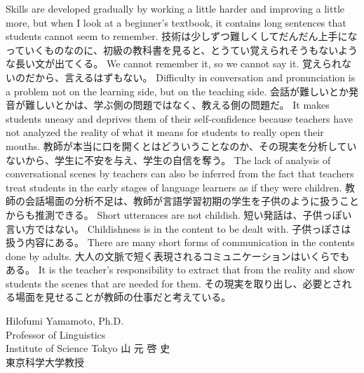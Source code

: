 \documentclass[uplatex,dvipdfmx,b5paper,english,10pt]{jsbook}
\begin{document}
\ifEnglish
Skills are developed gradually by working a little harder and improving a little more, but when I look at a beginner's textbook, it contains long sentences that students cannot seem to remember.
\else
技術は少しずつ難しくしてだんだん上手になっていくものなのに、初級の教科書を見ると、とうてい覚えられそうもないような長い文が出てくる。
\fi
\ifEnglish
We cannot remember it, so we cannot say it.
\else
覚えられないのだから、言えるはずもない。
\fi
\ifEnglish
Difficulty in conversation and pronunciation is a problem not on the learning side, but on the teaching side.
\else
会話が難しいとか発音が難しいとかは、学ぶ側の問題ではなく、教える側の問題だ。
\fi
\ifEnglish
It makes students uneasy and deprives them of their self-confidence because teachers have not analyzed the reality of what it means for students to really open their mouths.
\else
教師が本当に口を開くとはどういうことなのか、その現実を分析していないから、学生に不安を与え、学生の自信を奪う。
\fi
\ifEnglish
The lack of analysis of conversational scenes by teachers can also be inferred from the fact that teachers treat students in the early stages of language learners as if they were children.
\else
教師の会話場面の分析不足は、教師が言語学習初期の学生を子供のように扱うことからも推測できる。
\fi
\ifEnglish
Short utterances are not childish.
\else
短い発話は、子供っぽい言い方ではない。
\fi
\ifEnglish
Childishness is in the content to be dealt with.
\else
子供っぽさは扱う内容にある。
\fi
\ifEnglish
There are many short forms of communication in the contents done by adults.
\else
大人の文脈で短く表現されるコミュニケーションはいくらでもある。
\fi
\ifEnglish
It is the teacher's responsibility to extract that from the reality and show students the scenes that are needed for them.
\else
その現実を取り出し、必要とされる場面を見せることが教師の仕事だと考えている。
\fi

\vspace*{1\baselineskip}


\begin{flushright}
\ifEnglish
Hilofumi Yamamoto, Ph.D.\\
Professor of Linguistics\\
Institute of Science Tokyo 
\else
{\large 山 元 啓 史}\hspace*{3zw}\\
{\small 東京科学大学教授}\hspace*{2zw}\\
\fi
\end{flushright}
\fi%
\end{document}
